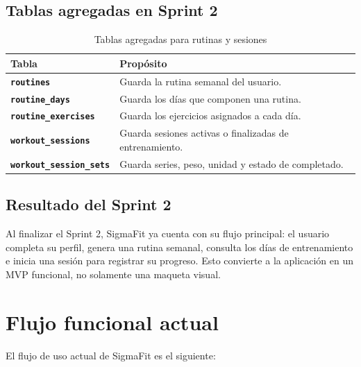\documentclass[12pt,a4paper]{article}
\begin{document}
\subsection{Tablas agregadas en Sprint 2}

\begin{table}[H]
\centering
\caption{Tablas agregadas para rutinas y sesiones}
\renewcommand{\arraystretch}{1.3}
\begin{tabularx}{\textwidth}{>{\bfseries}p{4cm} X}
\toprule
Tabla & Propósito \\
\midrule
\texttt{routines} & Guarda la rutina semanal del usuario. \\
\texttt{routine\_days} & Guarda los días que componen una rutina. \\
\texttt{routine\_exercises} & Guarda los ejercicios asignados a cada día. \\
\texttt{workout\_sessions} & Guarda sesiones activas o finalizadas de entrenamiento. \\
\texttt{workout\_session\_sets} & Guarda series, peso, unidad y estado de completado. \\
\bottomrule
\end{tabularx}
\end{table}

\subsection{Resultado del Sprint 2}

Al finalizar el Sprint 2, SigmaFit ya cuenta con su flujo principal: el usuario completa su perfil, genera una rutina semanal, consulta los días de entrenamiento e inicia una sesión para registrar su progreso. Esto convierte a la aplicación en un MVP funcional, no solamente una maqueta visual.

\section{Flujo funcional actual}

El flujo de uso actual de SigmaFit es el siguiente:
\end{document}
